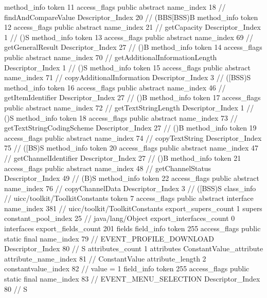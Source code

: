 {{{{{				}
				method_info {
					token	11
					access_flags	public abstract
					name_index	18		// findAndCompareValue
					Descriptor_Index	20		// (BBS[BSS)B
				}
				method_info {
					token	12
					access_flags	public abstract
					name_index	21		// getCapacity
					Descriptor_Index	1		// ()S
				}
				method_info {
					token	13
					access_flags	public abstract
					name_index	69		// getGeneralResult
					Descriptor_Index	27		// ()B
				}
				method_info {
					token	14
					access_flags	public abstract
					name_index	70		// getAdditionalInformationLength
					Descriptor_Index	1		// ()S
				}
				method_info {
					token	15
					access_flags	public abstract
					name_index	71		// copyAdditionalInformation
					Descriptor_Index	3		// ([BSS)S
				}
				method_info {
					token	16
					access_flags	public abstract
					name_index	46		// getItemIdentifier
					Descriptor_Index	27		// ()B
				}
				method_info {
					token	17
					access_flags	public abstract
					name_index	72		// getTextStringLength
					Descriptor_Index	1		// ()S
				}
				method_info {
					token	18
					access_flags	public abstract
					name_index	73		// getTextStringCodingScheme
					Descriptor_Index	27		// ()B
				}
				method_info {
					token	19
					access_flags	public abstract
					name_index	74		// copyTextString
					Descriptor_Index	75		// ([BS)S
				}
				method_info {
					token	20
					access_flags	public abstract
					name_index	47		// getChannelIdentifier
					Descriptor_Index	27		// ()B
				}
				method_info {
					token	21
					access_flags	public abstract
					name_index	48		// getChannelStatus
					Descriptor_Index	49		// (B)S
				}
				method_info {
					token	22
					access_flags	public abstract
					name_index	76		// copyChannelData
					Descriptor_Index	3		// ([BSS)S
				}
			}
		}
		class_info {		// uicc/toolkit/ToolkitConstants
			token	7
			access_flags	public abstract interface
			name_index	381		// uicc/toolkit/ToolkitConstants
			export_supers_count	1
			supers {
				constant_pool_index	25		// java/lang/Object
			}
			export_interfaces_count	0
			interfaces {
			}
			export_fields_count	201
			fields {
			field_info {
				token	255
				access_flags	public static final
				name_index	79		// EVENT_PROFILE_DOWNLOAD
				Descriptor_Index	80		// S
				attributes_count	1
				attributes {
				ConstantValue_attribute {
					attribute_name_index	81		// ConstantValue
					attribute_length	2
					constantvalue_index	82		// value = 1
				}
				}
			}
			field_info {
				token	255
				access_flags	public static final
				name_index	83		// EVENT_MENU_SELECTION
				Descriptor_Index	80		// S
}}}}}
